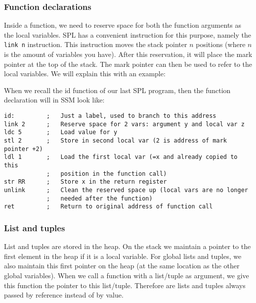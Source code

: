 \documentclass[a4paper]{article}
\begin{document}
\subsubsection{Function declarations}
Inside a function, we need to reserve space for both the function arguments as the local variables. SPL has a convenient instruction for this purpose, namely the {\tt link n} instruction. This instruction moves the stack pointer $n$ positions (where $n$ is the amount of variables you have). After this reservation, it will place the mark pointer at the top of the stack. The mark pointer can then be used to refer to the local variables. We will explain this with an example:

When we recall the id function of our last SPL program, then the function declaration will in SSM look like:
\begin{lstlisting}
id:			;	Just a label, used to branch to this address
link 2		;	Reserve space for 2 vars: argument y and local var z
ldc 5		;	Load value for y
stl 2		;	Store in second local var (2 is address of mark pointer +2)
ldl 1		;	Load the first local var (=x and already copied to this 
			;	position in the function call)
str RR		;	Store x in the return register
unlink		;	Clean the reserved space up (local vars are no longer 
			;	needed after the function)
ret			;	Return to original address of function call
\end{lstlisting}

\subsubsection{List and tuples}
List and tuples are stored in the heap. On the stack we maintain a pointer to the first element in the heap if it is a local variable. For global lists and tuples, we also maintain this first pointer on the heap (at the same location as the other global variables). When we call a function with a list/tuple as argument, we give this function the pointer to this list/tuple. Therefore are lists and tuples always passed by reference instead of by value. 
\end{document}
